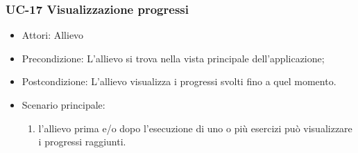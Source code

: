 	\subsubsection{UC-17 Visualizzazione progressi}
	\begin{itemize}
			\item Attori: Allievo
			\item Precondizione: L'allievo si trova nella vista principale dell'applicazione;
			\item Postcondizione: L'allievo visualizza i progressi svolti fino a quel momento.
			\item Scenario principale:
				\begin{enumerate}
					\item l'allievo prima e/o dopo l'esecuzione di uno o più esercizi può visualizzare i progressi raggiunti.
				\end{enumerate}
			\end{itemize}

